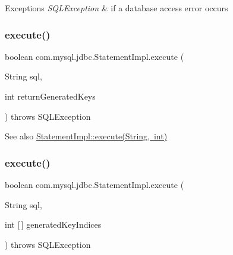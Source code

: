 \begin{DoxyExceptions}{Exceptions}
{\em S\+Q\+L\+Exception} & if a database access error occurs \\
\hline
\end{DoxyExceptions}
\mbox{\label{classcom_1_1mysql_1_1jdbc_1_1_statement_impl_a8d055e029c35d81159ecf3ebc89914fe}} 
\subsubsection{\texorpdfstring{execute()}{execute()}\hspace{0.1cm}{\footnotesize\ttfamily [2/4]}}
{\footnotesize\ttfamily boolean com.\+mysql.\+jdbc.\+Statement\+Impl.\+execute (\begin{DoxyParamCaption}\item[{String}]{sql,  }\item[{int}]{return\+Generated\+Keys }\end{DoxyParamCaption}) throws S\+Q\+L\+Exception}

\begin{DoxySeeAlso}{See also}
\mbox{\hyperlink{classcom_1_1mysql_1_1jdbc_1_1_statement_impl_a8d055e029c35d81159ecf3ebc89914fe}{Statement\+Impl\+::execute(\+String, int)}} 
\end{DoxySeeAlso}
\mbox{\label{classcom_1_1mysql_1_1jdbc_1_1_statement_impl_a2a26cd7d2f2c7f9b476750eba63249b7}} 
\subsubsection{\texorpdfstring{execute()}{execute()}\hspace{0.1cm}{\footnotesize\ttfamily [3/4]}}
{\footnotesize\ttfamily boolean com.\+mysql.\+jdbc.\+Statement\+Impl.\+execute (\begin{DoxyParamCaption}\item[{String}]{sql,  }\item[{int \mbox{[}$\,$\mbox{]}}]{generated\+Key\+Indices }\end{DoxyParamCaption}) throws S\+Q\+L\+Exception}

